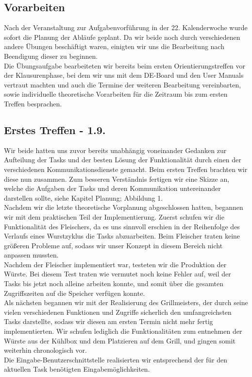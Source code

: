 \subsection{Vorarbeiten}

Nach der Veranstaltung zur Aufgabenvorführung in der 22. Kalenderwoche wurde sofort die Planung der Abläufe geplant. Da wir beide noch durch verschiedenen andere Übungen beschäftigt waren, einigten wir uns die Bearbeitung nach Beendigung dieser zu beginnen.\\
Die Übungsaufgabe bearbeiteten wir bereits beim ersten Orientierungstreffen vor der Klausurenphase, bei dem wir uns mit dem DE-Board und den User Manuals vertraut machten und auch die Termine der weiteren Bearbeitung vereinbarten, sowie individuelle theoretische Vorarbeiten für die Zeitraum bis zum ersten Treffen besprachen.

\subsection{Erstes Treffen - 1.9.}

Wir beide hatten uns zuvor bereits unabhängig voneinander Gedanken zur Aufteilung der Tasks und der besten Lösung der Funktionalität durch einen der verschiedenen Kommunikationsdienste gemacht. Beim ersten Treffen brachten wir diese nun zusammen. Zum besseren Verständnis fertigen wir eine Skizze an, welche die Aufgaben der Tasks und deren Kommunikation untereinander darstellen sollte, siehe Kapitel Planung; Abbildung 1.\\

Nachdem wir die letzte theoretische Vorplanung abgeschlossen hatten, begannen wir mit dem praktischen Teil der Implementierung. Zuerst schufen wir die Funktionalität des Fleischers, da es uns sinnvoll erschien in der Reihenfolge des Verlaufs eines Wurstzyklus die Tasks abzuarbeiten. Beim Fleischer traten keine größeren Probleme auf, sodass wir unser Konzept in diesem Bereich nicht anpassen mussten.\\
Nachdem der Fleischer implementiert war, testeten wir die Produktion der Würste. Bei diesem Test traten wie vermutet noch keine Fehler auf, weil der Tasks bis jetzt noch alleine arbeiten konnte, und somit über die gesamten Zugriffszeiten auf die Speicher verfügen konnte.\\

Als nächsten begannen wir mit der Realisierung des Grillmeisters, der durch seine vielen verschiedenen Funktionen und Zugriffe sicherlich den umfangreichsten Tasks darstellte, sodass wir diesen am ersten Termin nicht mehr fertig implementierten. Wir schufen lediglich die Funktionalitäten zum entnehmen der Würste aus der Kühlbox und dem Platzieren auf dem Grill, und gingen somit weiterhin chronologisch vor.\\
Die Eingabe-Benutzerschnittstelle realisierten wir entsprechend der für den aktuellen Task benötigten Eingabemöglichkeiten.

